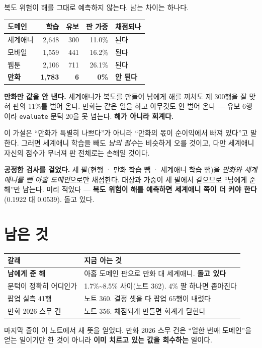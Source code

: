 \documentclass[11pt]{article}
\begin{document}
복도 위험이 해를 그대로 예측하지 않는다. 남는 차이는 하나다.

\begin{center}
\begin{tabular}{lrrrl}
\hline
도메인 & 학습 & 유보 & 판 가중 & 채점되나 \\
\hline
세계애니 & 2,648 & 300 & 11.0\% & 된다 \\
모바일   & 1,559 & 441 & 16.2\% & 된다 \\
웹툰     & 2,106 & 711 & 26.1\% & 된다 \\
\textbf{만화} & \textbf{1,783} & \textbf{6} & \textbf{0\%} & \textbf{안 된다} \\
\hline
\end{tabular}
\end{center}

\textbf{만화만 값을 안 낸다.} 세계애니가 복도를 만들어 남에게 해를 끼쳐도
제 300행을 잘 맞혀 판의 11\%를 벌어 온다. 만화는 같은 일을 하고 아무것도
안 벌어 온다 --- 유보 6행이라 \texttt{evaluate} 문턱 20을 못 넘는다.
\textbf{해가 아니라 회계다.}

이 가설은 ``만화가 특별히 나쁘다''가 아니라 ``만화의 몫이 순이익에서
빠져 있다''고 말한다. 그러면 세계애니 학습을 빼도 \emph{남의 점수}는
비슷하게 오를 것이고, 다만 세계애니 자신의 점수가 무너져 판 전체로는
손해일 것이다.

\textbf{공정한 검사를 걸었다.} 세 팔(현행 · 만화 학습 뺌 · 세계애니 학습
뺌)을 \emph{만화와 세계애니를 뺀 아홉 도메인}으로만 채점한다. 대상과
가중이 세 팔에서 같으므로 ``남에게 준 해''만 남는다. 미리 적었다 ---
\textbf{복도 위험이 해를 예측하면 세계애니 쪽이 더 커야 한다}(0.1922 대
0.0539). 돌고 있다.

\section{남은 것}

\begin{center}
\begin{tabular}{ll}
\hline
갈래 & 지금 아는 것 \\
\hline
\textbf{남에게 준 해} & 아홉 도메인 판으로 만화 대 세계애니. \textbf{돌고 있다} \\
문턱이 정확히 어디인가 & 1.7\%\textasciitilde{}8.5\% 사이(노트 362). 4\% 팔 하나면 좁아진다 \\
팝업 실측 41행 & 노트 360. 결정 셋을 다 팝업 65행이 내렸다 \\
만화 2026 스무 건 & 노트 356. 채점되게 만들면 회계가 닫힌다 \\
\hline
\end{tabular}
\end{center}

마지막 줄이 이 노트에서 새 뜻을 얻었다. 만화 2026 스무 건은 ``열한 번째
도메인''을 얻는 일이기만 한 것이 아니라 \textbf{이미 치르고 있는 값을
회수하는} 일이다.
\end{document}

